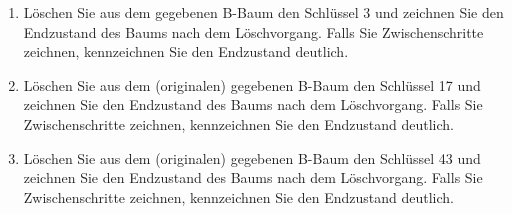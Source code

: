 \documentclass{bschlangaul-aufgabe}
\begin{document}
\begin{enumerate}
\begin{enumerate}
%

\item Löschen Sie aus dem gegebenen B-Baum den Schlüssel 3 und zeichnen
Sie den Endzustand des Baums nach dem Löschvorgang. Falls Sie
Zwischenschritte zeichnen, kennzeichnen Sie den Endzustand deutlich.

%

\item Löschen Sie aus dem (originalen) gegebenen B-Baum den Schlüssel 17
und zeichnen Sie den Endzustand des Baums nach dem Löschvorgang. Falls
Sie Zwischenschritte zeichnen, kennzeichnen Sie den Endzustand deutlich.

%

\item Löschen Sie aus dem (originalen) gegebenen B-Baum den Schlüssel 43
und zeichnen Sie den Endzustand des Baums nach dem Löschvorgang. Falls
Sie Zwischenschritte zeichnen, kennzeichnen Sie den Endzustand deutlich.
\end{enumerate}
\end{enumerate}
\end{document}

